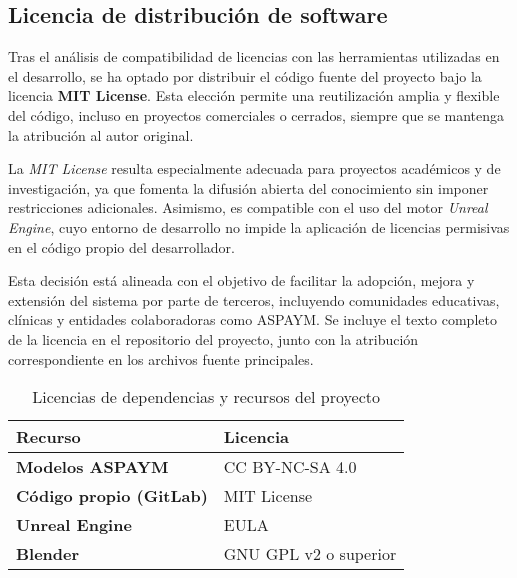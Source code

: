 \subsection{Licencia de distribución de software}

Tras el análisis de compatibilidad de licencias con las herramientas utilizadas en el desarrollo, se ha optado por distribuir el código fuente del proyecto bajo la licencia \textbf{MIT License}. Esta elección permite una reutilización amplia y flexible del código, incluso en proyectos comerciales o cerrados, siempre que se mantenga la atribución al autor original. 

La \textit{MIT License} resulta especialmente adecuada para proyectos académicos y de investigación, ya que fomenta la difusión abierta del conocimiento sin imponer restricciones adicionales. Asimismo, es compatible con el uso del motor \textit{Unreal Engine}, cuyo entorno de desarrollo no impide la aplicación de licencias permisivas en el código propio del desarrollador.

Esta decisión está alineada con el objetivo de facilitar la adopción, mejora y extensión del sistema por parte de terceros, incluyendo comunidades educativas, clínicas y entidades colaboradoras como ASPAYM. Se incluye el texto completo de la licencia en el repositorio del proyecto, junto con la atribución correspondiente en los archivos fuente principales.

\begin{table}[p]
	\centering
	\begin{tabularx}{\linewidth}{ p{} p{} }
		\toprule
		\textbf{Recurso} & \textbf{Licencia} \\
		\toprule
		\textbf{Modelos ASPAYM} & 
			CC BY-NC-SA 4.0 \\
		\addlinespace
		\textbf{Código propio (GitLab)} &
			MIT License \\
		\addlinespace
		\textbf{Unreal Engine} &
			EULA \\
		\addlinespace
		\textbf{Blender} &
			GNU GPL v2 o superior \\
		\bottomrule
	\end{tabularx}
	\caption{Licencias de dependencias y recursos del proyecto}
	\label{tab:licencias-dependencias}
\end{table}




